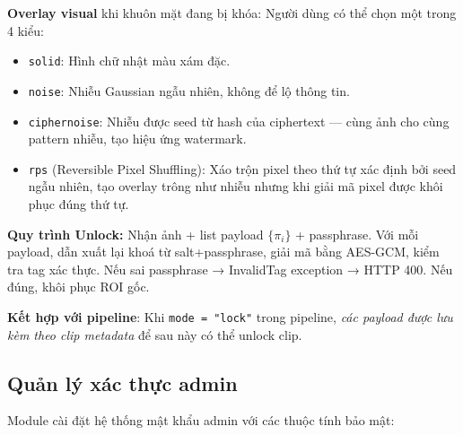 \medskip
\textbf{Overlay visual} khi khuôn mặt đang bị khóa: Người dùng có thể chọn một trong 4 kiểu:
\begin{itemize}
    \item \texttt{solid}: Hình chữ nhật màu xám đặc.
    \item \texttt{noise}: Nhiễu Gaussian ngẫu nhiên, không để lộ thông tin.
    \item \texttt{ciphernoise}: Nhiễu được seed từ hash của ciphertext --- cùng ảnh cho cùng pattern nhiễu, tạo hiệu ứng watermark.
    \item \texttt{rps} (Reversible Pixel Shuffling): Xáo trộn pixel theo thứ tự xác định bởi seed ngẫu nhiên, tạo overlay trông như nhiễu nhưng khi giải mã pixel được khôi phục đúng thứ tự.
\end{itemize}

\medskip
\textbf{Quy trình Unlock:} Nhận ảnh + list payload $\{\pi_i\}$ + passphrase. Với mỗi payload, dẫn xuất lại khoá từ salt+passphrase, giải mã bằng AES-GCM, kiểm tra tag xác thực. Nếu sai passphrase → InvalidTag exception → HTTP 400. Nếu đúng, khôi phục ROI gốc.

\medskip
\textbf{Kết hợp với pipeline}: Khi \texttt{mode = "lock"} trong pipeline, \textit{các payload được lưu kèm theo clip metadata} để sau này có thể unlock clip.

\subsection{Quản lý xác thực admin}
\label{subsec:adminauth}

Module  cài đặt hệ thống mật khẩu admin với các thuộc tính bảo mật:

